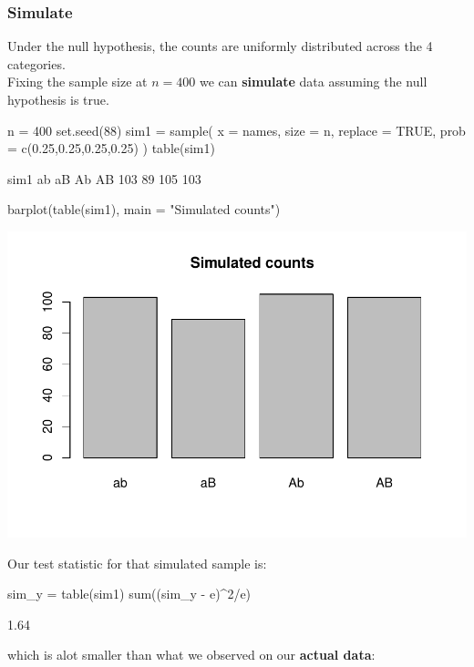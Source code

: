 \documentclass[a4paper]{article}
\begin{document}
\subsubsection{Simulate}
Under the null hypothesis, the counts are uniformly distributed across the 4 categories.\\
Fixing the sample size at \( n = 400 \) we can \textbf{simulate} data assuming the null hypothesis is true.
\begin{Schunk}
\begin{Sinput}
n = 400
set.seed(88)
sim1 = sample(
  x = names,
  size = n,
  replace = TRUE,
  prob = c(0.25,0.25,0.25,0.25)
)
table(sim1)
\end{Sinput}
\begin{Soutput}
sim1
 ab  aB  Ab  AB 
103  89 105 103 
\end{Soutput}
\begin{Sinput}
barplot(table(sim1), main = "Simulated counts")
\end{Sinput}


{\centering \includegraphics[width=\maxwidth]{figure/listings-unnamed-chunk-18-1} 

}

\end{Schunk}
Our test statistic for that simulated sample is:
\begin{Schunk}
\begin{Sinput}
sim_y = table(sim1)
sum((sim_y - e)^2/e)
\end{Sinput}
\begin{Soutput}
[1] 1.64
\end{Soutput}
\end{Schunk}
which is alot smaller than what we observed on our \textbf{actual data}:
\end{document}
